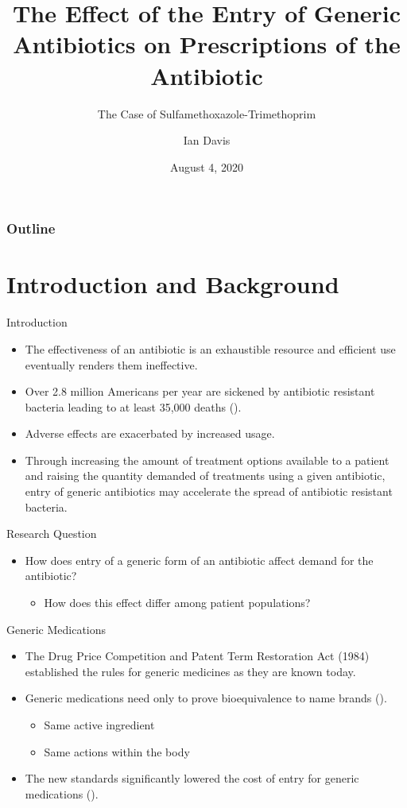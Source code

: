 \documentclass{beamer}
\title{The Effect of the Entry of Generic Antibiotics on Prescriptions of the Antibiotic}
\subtitle{The Case of Sulfamethoxazole-Trimethoprim}
\author{Ian Davis}
\institute{Clemson University}
\date{August 4, 2020}
\begin{document}
\begin{frame}
\titlepage
\end{frame}

\begin{frame}
\frametitle{Outline}
\tableofcontents
\end{frame}

\section{Introduction and Background}
\begin{frame}{Introduction}
\begin{itemize}
\item The effectiveness of an antibiotic is an exhaustible resource and efficient use eventually renders them ineffective.
\item Over 2.8 million Americans per year are sickened by antibiotic resistant bacteria leading to at least 35,000 deaths (\cite{centers_for_disease_control_and_prevention_us_antibiotic_2019}).
\item Adverse effects are exacerbated by increased usage.
\item Through increasing the amount of treatment options available to a patient and raising the quantity demanded of treatments using a given antibiotic, entry of generic antibiotics may accelerate the spread of antibiotic resistant bacteria.
\end{itemize}
\end{frame}

\begin{frame}{Research Question}
\begin{itemize}
\item How does entry of a generic form of an antibiotic affect demand for the antibiotic?
\begin{itemize}
\item How does this effect differ among patient populations?
\end{itemize}
\end{itemize}
\end{frame}

\begin{frame}{Generic Medications}
\begin{itemize}
\item The Drug Price Competition and Patent Term Restoration Act (1984) established the rules for generic medicines as they are known today.
\item Generic medications need only to prove bioequivalence to name brands (\cite{fda_primer}).
\begin{itemize}
  \item Same active ingredient
  \item Same actions within the body
\end{itemize}
\item The new standards significantly lowered the cost of entry for generic medications (\cite{eban_bottle_2019}).
\end{itemize}
\end{frame}
\end{document}
